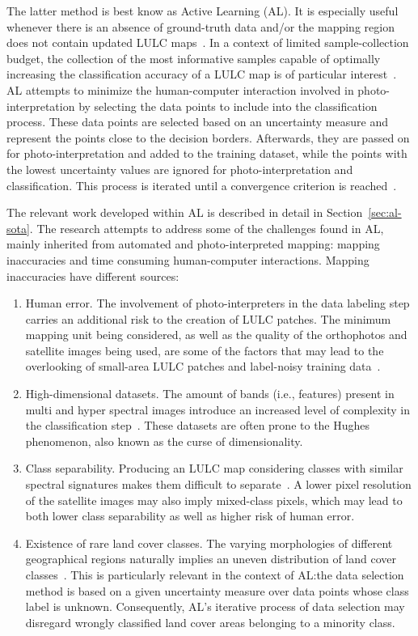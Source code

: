 \documentclass[parskip=full]{scrartcl}
\begin{document}
The latter method is best know as Active Learning (AL). It is especially useful whenever there is an
absence of ground-truth data and/or the mapping region does not contain updated LULC
maps~\cite{Su2020}. In a context of limited sample-collection budget, the collection of the most
informative samples capable of optimally increasing the classification accuracy of a LULC map is of
particular interest~\cite{Su2020}. AL attempts to minimize the human-computer interaction involved
in photo-interpretation by selecting the data points to include into the classification process.
These data points are selected based on an uncertainty measure and represent the points close to the
decision borders. Afterwards, they are passed on for photo-interpretation and added to the training
dataset, while the points with the lowest uncertainty values are ignored for photo-interpretation
and classification. This process is iterated until a convergence criterion is
reached~\cite{Pasolli2016}. 

The relevant work developed within AL is described in detail in Section~\ref{sec:al-sota}.
The research attempts to address some of the challenges found in AL, mainly inherited from
automated and photo-interpreted mapping: mapping inaccuracies and time consuming
human-computer interactions. 
Mapping inaccuracies have different sources:

\begin{enumerate}
    \item Human error. The involvement of photo-interpreters in the data labeling step carries an
        additional risk to the creation of LULC patches. The minimum mapping unit being considered,
        as well as the quality of the orthophotos and satellite images being used, are some of the
        factors that may lead to the overlooking of small-area LULC patches and label-noisy training
        data~\cite{Pelletier2017}.
    \item High-dimensional datasets. The amount of bands (i.e., features) present in multi and hyper
        spectral images introduce an increased level of complexity in the classification
        step~\cite{Stromann2020}. These datasets are often prone to the Hughes phenomenon, also
        known as the curse of dimensionality. 
    \item Class separability. Producing an LULC map considering classes with similar spectral
        signatures makes them difficult to separate~\cite{Alonso-Sarria2019}. A lower pixel
        resolution of the satellite images may also imply mixed-class pixels, which may lead to
        both lower class separability as well as higher risk of human error.
    \item Existence of rare land cover classes. The varying morphologies of different geographical
        regions naturally implies an uneven distribution of land cover classes~\cite{Feng2018}. This
        is particularly relevant in the context of AL:\@ the data selection method is based on a
        given uncertainty measure over data points whose class label is unknown. Consequently, AL's
        iterative process of data selection may disregard wrongly classified land cover areas
        belonging to a minority class.
\end{enumerate}
\end{document}
